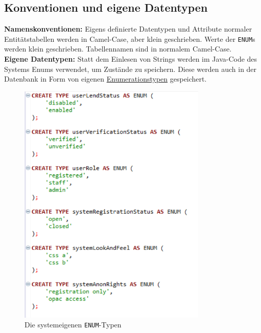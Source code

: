 \documentclass{article}
\begin{document}
\subsection{Konventionen und eigene Datentypen}
\textbf{Namenskonventionen:} Eigens definierte Datentypen und Attribute normaler Entitätstabellen werden in Camel-Case, aber klein geschrieben. Werte der \texttt{ENUM}s werden klein geschrieben. Tabellennamen sind in normalem Camel-Case. \\
\textbf{Eigene Datentypen:} Statt dem Einlesen von Strings werden im Java-Code des Systems Enums verwendet, um Zustände zu speichern. Diese werden auch in der Datenbank in Form von eigenen \hyperlink{ENUMs}{Enumerationstypen} gespeichert. 
\begin{figure}
\hypertarget{ENUMs}{}
\centering
\includegraphics[width=9cm]{SQLENUMs1}
\caption{Die systemeigenen \texttt{ENUM}-Typen}
\end{figure}
\end{document}
